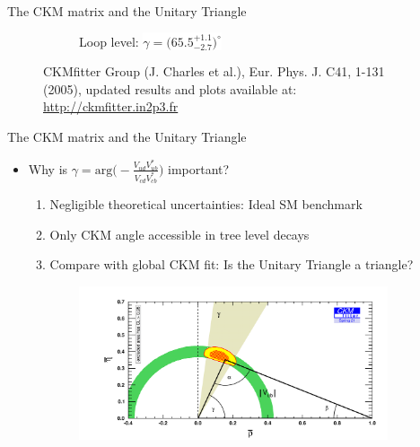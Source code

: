 \documentclass[dvipsnames]{beamer}
\begin{document}
\begin{frame}{The CKM matrix and the Unitary Triangle}
\begin{figure}
\begin{subfigure}{0.5\textwidth}
      \caption*{Loop level: \colorbox{white}{$\gamma = \big(65.5^{+1.1}_{-2.7}\big)^\circ$}}
    \end{subfigure}
    \vspace{-0.3cm}
    \captionsetup{justification=centering}
    \caption*{\centering\tiny CKMfitter Group (J. Charles et al.), Eur. Phys. J. C41, 1-131 (2005), updated results and plots available at: \href{http://ckmfitter.in2p3.fr}{http://ckmfitter.in2p3.fr}}
  \end{figure}
  \vspace{-0.7cm}
  \begin{center}
    \phantom{Need to reduce uncertainties significantly in direct measurements!}
  \end{center}
\end{frame}

\begin{frame}{The CKM matrix and the Unitary Triangle}
  \begin{itemize}
    \setlength\itemsep{0.5em}
    \item{Why is $\gamma = \text{arg}\Big(-\frac{V^{\phantom{*}}_{ud}V^*_{ub}}{V^{\phantom{*}}_{cd}V^*_{cb}}\Big)$ important?}
    \begin{enumerate}
    \setlength\itemsep{0.5em}
      \item{Negligible theoretical uncertainties: Ideal SM benchmark}
      \item{Only CKM angle accessible in tree level decays}
      \item{Compare with global CKM fit: Is the Unitary Triangle a triangle?}
    \end{enumerate}
  \end{itemize}
  \vspace{-0.2cm}
  \begin{figure}
    \centering
    \begin{subfigure}{0.5\textwidth}
      \centering
      \includegraphics[width = 1.0\textwidth]{Plots/ckmfitter_tree.png}

\end{subfigure}
\end{figure}
\end{frame}
\end{document}
